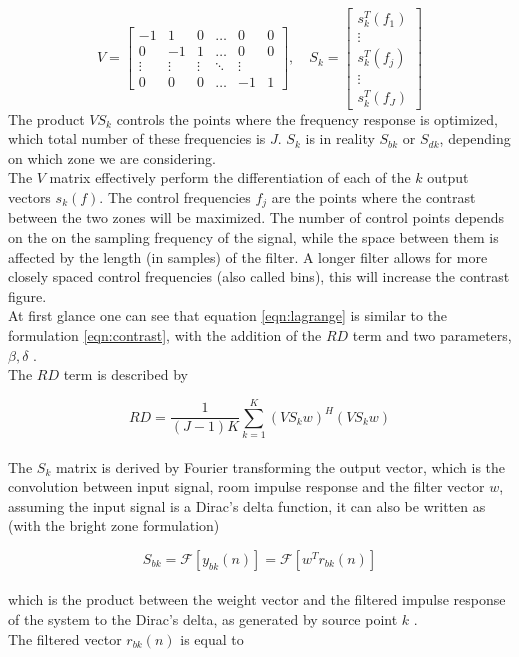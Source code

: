 \[V=\begin{bmatrix}
    -1 & 1 & 0 & \dots & 0 & 0 \\
    0 & -1 & 1 & \dots & 0 & 0 \\
    \vdots & \vdots & \vdots & \ddots & \vdots \\
    0 & 0 & 0 & \dots & -1 & 1
	\end{bmatrix}, \quad
S_k= \begin{bmatrix}
    s_{k}^T(f_1) \\
    \vdots \\
    s_{k}^T(f_j)\\
    \vdots \\
    s_{k}^T(f_J)
	\end{bmatrix}
\]
The product $V S_k$ controls the points where the frequency response is optimized, which total number of these frequencies is $J$. $S_k$ is in reality $S_{bk}$ or $S_{dk}$, depending on which zone we are considering.
\\
The $V$ matrix effectively perform the differentiation of each of the $k$ output vectors $s_{k}(f)$. The control frequencies $f_j$ are the points where the contrast between the two zones will be maximized. The number of control points depends on the on the sampling frequency of the signal, while the space between them is affected by the length (in samples) of the filter. A longer filter allows for more closely spaced control frequencies (also called bins), this will increase the contrast figure.
\\
At first glance one can see that equation \ref{eqn:lagrange} is similar to the formulation \ref{eqn:contrast}, with the addition of the $RD$ term and two parameters, $\beta,\delta$ \parencite{cai_time-domain_2014}.
\\
The $RD$ term is described by

\begin{equation}
RD = \frac{1}{(J-1)K}\sum\limits_{k=1}^K (V S_k w)^H (V S_k w)
\label{eqn:RD}
\end{equation}
\\
The $S_k$ matrix is derived by Fourier transforming the output vector, which is the convolution between input signal, room impulse response and the filter vector $w$, assuming the input signal is a Dirac's delta function, it can also be written as (with the bright zone formulation)

\[S_{bk}=\mathcal{F}[y_{bk}(n)]=\mathcal{F}[w^T r_{bk}(n)]\]
\\
which is the product between the weight vector and the filtered impulse response of the system to the Dirac's delta, as generated by source point $k$ \parencite{cai_time-domain_2014}.
\\
The filtered vector $r_{bk}(n)$ is equal to

